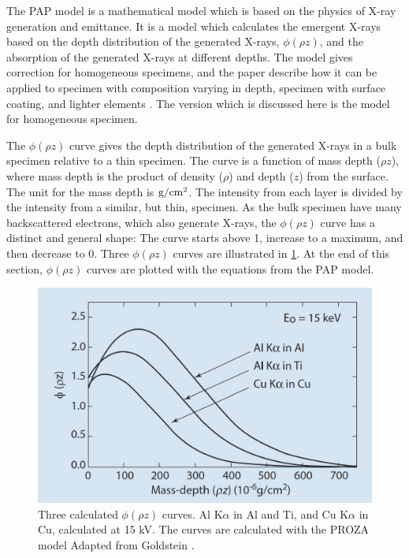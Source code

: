 The PAP model is a mathematical model which is based on the physics of X-ray generation and emittance.
It is a model which calculates the emergent X-rays based on the depth distribution of the generated X-rays, $\phi(\rho z)$, and the absorption of the generated X-rays at different depths.
The model gives correction for homogeneous specimens, and the paper describe how it can be applied to specimen with composition varying in depth, specimen with surface coating, and lighter elements \cite{pap_1991}.
The version which is discussed here is the model for homogeneous specimen.


The $\phi(\rho z)$ curve gives the depth distribution of the generated X-rays in a bulk specimen relative to a thin specimen.
The curve is a function of mass depth ($\rho z$), where mass depth is the product of density ($\rho$) and depth ($z$) from the surface. 
The unit for the mass depth is $\textnormal{g}/\textnormal{cm}^2$.
The intensity from each layer is divided by the intensity from a similar, but thin, specimen.
As the bulk specimen have many backscattered electrons, which also generate X-rays, the $\phi(\rho z)$ curve has a distinct and general shape:
The curve starts above 1, increase to a maximum, and then decrease to 0.
Three $\phi(\rho z)$ curves are illustrated in \cref{fig:theory:quantification:phi_rho_z_curves}.
At the end of this section, $\phi(\rho z)$ curves are plotted with the equations from the PAP model.




\begin{figure}[htbp]
    \centering
    \includegraphics[width=0.65\linewidth]{figures/phi_rho_z_curves__goldstein.png}
    \caption{
        Three calculated $\phi(\rho z)$ curves.
        Al K$\alpha$ in Al and Ti, and Cu K$\alpha$ in Cu, calculated at 15 kV.
        The curves are calculated with the PROZA model \cite{bastin_proza_1988}
        Adapted from Goldstein \cite[Fig. 19.9]{goldstein_scanning_2018}.
    }
    \label{fig:theory:quantification:phi_rho_z_curves}
\end{figure}


